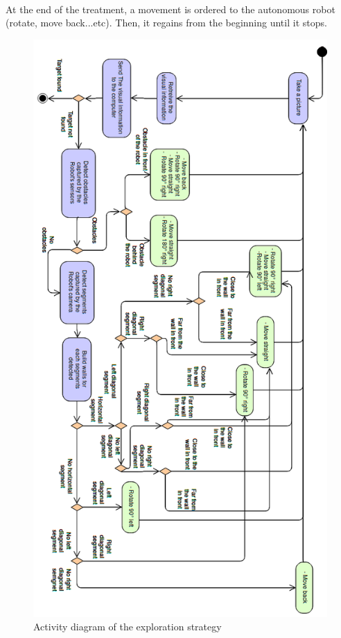 \documentclass[12pt]{report}
\begin{document}
\paragraph{}
At the end of the treatment, a movement is ordered to the autonomous robot (rotate, move back...etc). Then, it regains from the beginning until it stops.
\newpage
	\begin{figure}[H]
	\begin{center}
		\includegraphics[scale=0.55]{res/order_processing.png}
		\caption{Activity diagram of the exploration strategy}
	\end{center}
\end{figure}
\newpage
\end{document}
